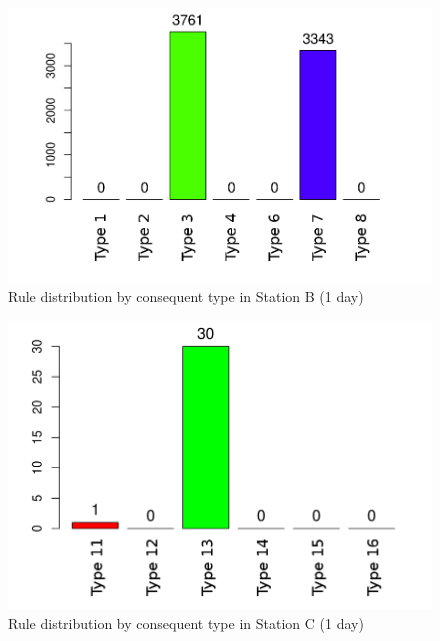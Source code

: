 \begin{figure}[hbtp]
\includegraphics[width=\textwidth]{img/conseqtypes_ant1.png}
\caption{Rule distribution by consequent type in Station B (1 day)} \label{fig:conseqtypes_ant1}
\end{figure}

\begin{figure}[hbtp]
\includegraphics[width=\textwidth]{img/conseqtypes_seg1.png}
\caption{Rule distribution by consequent type in Station C (1 day)} \label{fig:conseqtypes_seg1}
\end{figure}

